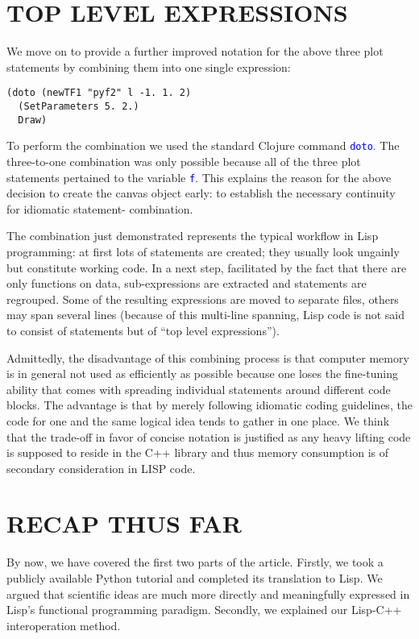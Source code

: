 \documentclass[twocolumn]{article}
\begin{document}
\section{TOP LEVEL EXPRESSIONS}
We move on to provide a further improved notation for the above three plot statements by combining them into one single expression:
{\color{blue} \begin{verbatim}
(doto (newTF1 "pyf2" l -1. 1. 2)
  (SetParameters 5. 2.)
  Draw)
\end{verbatim}}
To perform the combination we used the standard Clojure command \texttt{\textcolor{blue}{doto}}. The three-to-one combination was only possible because all of the three plot statements pertained to the variable \texttt{\textcolor{blue}{f}}. This explains the reason for the above decision to create the canvas object early: to establish the necessary continuity for idiomatic statement- combination.

The combination just demonstrated represents the typical workflow in Lisp programming: at first lots of statements are created; they usually look ungainly but constitute working code. In a next step, facilitated by the fact that there are only functions on data, sub-expressions are extracted and statements are regrouped. Some of the resulting expressions are moved to separate files, others may span several lines (because of this multi-line spanning, Lisp code is not said to consist of statements but of “top level expressions”).

Admittedly, the disadvantage of this combining process is that computer memory is in general not used as efficiently as possible because one loses the fine-tuning ability that comes with spreading individual statements around different code blocks. The advantage is that by merely following idiomatic coding guidelines, the code for one and the same logical idea tends to gather in one place. We think that the trade-off in favor of concise notation is justified as any heavy lifting code is supposed to reside in the C++ library and thus memory consumption is of secondary consideration in LISP code.

\section{RECAP THUS FAR}
By now, we have covered the first two parts of the article. Firstly, we took a publicly available Python tutorial and completed its translation to Lisp. We argued that scientific ideas are much more directly and meaningfully expressed in Lisp’s functional programming paradigm. Secondly, we explained our Lisp-C++ interoperation method.
\end{document}
